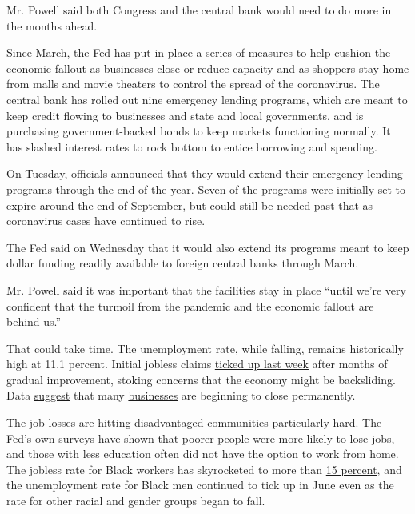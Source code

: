 Mr. Powell said both Congress and the central bank would need to do more
in the months ahead.

Since March, the Fed has put in place a series of measures to help
cushion the economic fallout as businesses close or reduce capacity and
as shoppers stay home from malls and movie theaters to control the
spread of the coronavirus. The central bank has rolled out nine
emergency lending programs, which are meant to keep credit flowing to
businesses and state and local governments, and is purchasing
government-backed bonds to keep markets functioning normally. It has
slashed interest rates to rock bottom to entice borrowing and spending.

On Tuesday,
\href{https://www.nytimes3xbfgragh.onion/2020/07/28/business/economy/coronavirus-federal-reserve-policy.html}{officials
announced} that they would extend their emergency lending programs
through the end of the year. Seven of the programs were initially set to
expire around the end of September, but could still be needed past that
as coronavirus cases have continued to rise.

The Fed said on Wednesday that it would also extend its programs meant
to keep dollar funding readily available to foreign central banks
through March.

Mr. Powell said it was important that the facilities stay in place
``until we're very confident that the turmoil from the pandemic and the
economic fallout are behind us.''

That could take time. The unemployment rate, while falling, remains
historically high at 11.1 percent. Initial jobless claims
\href{https://www.nytimes3xbfgragh.onion/2020/07/23/business/economy/unemployment-economy-coronavirus.html}{ticked
up last week} after months of gradual improvement, stoking concerns that
the economy might be backsliding. Data
\href{https://www.washingtonpost.com/business/2020/07/23/permanent-business-closures-yelp/}{suggest}
that many
\href{https://www.nytimes3xbfgragh.onion/2020/07/13/business/small-businesses-coronavirus.html}{businesses}
are beginning to close permanently.

The job losses are hitting disadvantaged communities particularly hard.
The Fed's own surveys have shown that poorer people were
\href{https://www.nytimes3xbfgragh.onion/2020/05/14/business/economy/coronavirus-jobless-unemployment.html}{more
likely to lose jobs}, and those with less education often did not have
the option to work from home. The jobless rate for Black workers has
skyrocketed to more than
\href{https://www.bls.gov/news.release/empsit.t02.htm}{15 percent}, and
the unemployment rate for Black men continued to tick up in June even as
the rate for other racial and gender groups began to fall.

